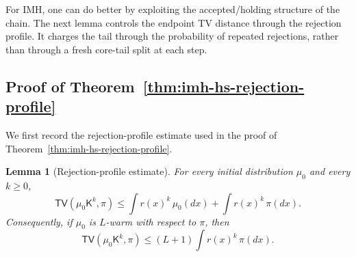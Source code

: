 \documentclass[10pt, journal]{IEEEtran}
\newcommand{\sK}{\mathsf{K}}
\newtheorem{lemma}{Lemma}
\begin{document}
For IMH, one can do better by exploiting the accepted/holding structure of the chain. The next lemma controls the endpoint TV distance through the rejection profile. It charges the tail through the probability of repeated rejections, rather than through a fresh core-tail split at each step.

\subsection{Proof of Theorem~\ref{thm:imh-hs-rejection-profile}}
\label{app:imh_rejection_profile}

We first record the rejection-profile estimate used in the proof of Theorem~\ref{thm:imh-hs-rejection-profile}.
\begin{lemma}[Rejection-profile estimate] \label{lem:rejection-profile} For every initial distribution $\mu_0$ and every $k\ge0$, $$\mathsf{TV}(\mu_0\sK^k,\pi)\le \int r(x)^k\,\mu_0(dx)+\int r(x)^k\,\pi(dx).$$ Consequently, if $\mu_0$ is $L$-warm with respect to $\pi$, then $$\mathsf{TV}(\mu_0\sK^k,\pi)\le (L+1)\int r(x)^k\,\pi(dx).$$ \end{lemma}
\end{document}
